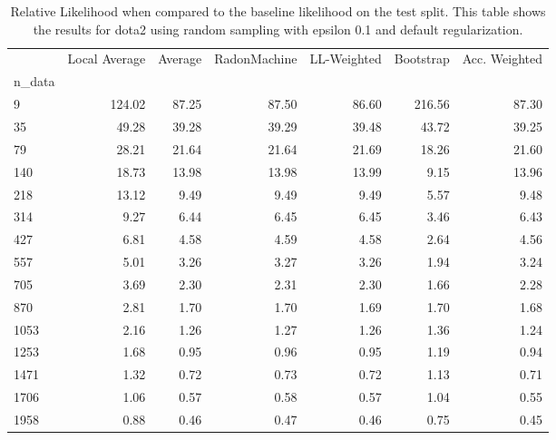 \begin{table}
\centering
\caption{Relative Likelihood when compared to the baseline likelihood on the test split. This table shows the results for  dota2 using  random sampling with epsilon  0.1 and  default regularization.}
\label{tab:12}
\begin{tabular}{lrrrrrr}
\toprule
{} &  Local Average &  Average &  RadonMachine &  LL-Weighted &  Bootstrap &  Acc. Weighted \\
n\_data &                &          &               &              &            &                \\
\midrule
9      &         124.02 &    87.25 &         87.50 &        86.60 &     216.56 &          87.30 \\
35     &          49.28 &    39.28 &         39.29 &        39.48 &      43.72 &          39.25 \\
79     &          28.21 &    21.64 &         21.64 &        21.69 &      18.26 &          21.60 \\
140    &          18.73 &    13.98 &         13.98 &        13.99 &       9.15 &          13.96 \\
218    &          13.12 &     9.49 &          9.49 &         9.49 &       5.57 &           9.48 \\
314    &           9.27 &     6.44 &          6.45 &         6.45 &       3.46 &           6.43 \\
427    &           6.81 &     4.58 &          4.59 &         4.58 &       2.64 &           4.56 \\
557    &           5.01 &     3.26 &          3.27 &         3.26 &       1.94 &           3.24 \\
705    &           3.69 &     2.30 &          2.31 &         2.30 &       1.66 &           2.28 \\
870    &           2.81 &     1.70 &          1.70 &         1.69 &       1.70 &           1.68 \\
1053   &           2.16 &     1.26 &          1.27 &         1.26 &       1.36 &           1.24 \\
1253   &           1.68 &     0.95 &          0.96 &         0.95 &       1.19 &           0.94 \\
1471   &           1.32 &     0.72 &          0.73 &         0.72 &       1.13 &           0.71 \\
1706   &           1.06 &     0.57 &          0.58 &         0.57 &       1.04 &           0.55 \\
1958   &           0.88 &     0.46 &          0.47 &         0.46 &       0.75 &           0.45 \\
\bottomrule
\end{tabular}
\end{table}
